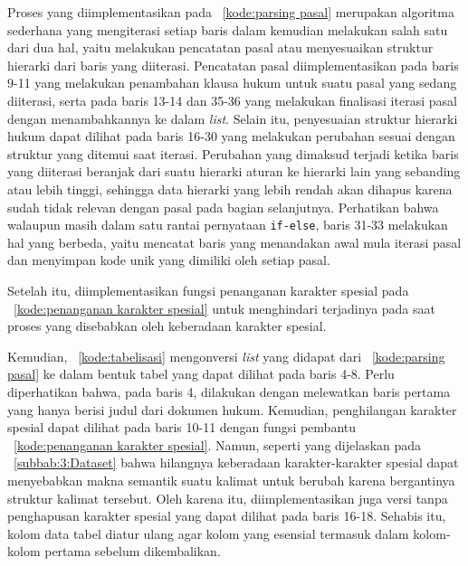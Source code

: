 Proses \parsing{} yang diimplementasikan pada \kode{}~\ref{kode:parsing pasal} merupakan algoritma sederhana yang mengiterasi setiap baris dalam \file{} kemudian melakukan salah satu dari dua hal, yaitu melakukan pencatatan pasal atau menyesuaikan struktur hierarki dari baris yang diiterasi. Pencatatan pasal diimplementasikan pada baris 9-11 yang melakukan penambahan klausa hukum untuk suatu pasal yang sedang diiterasi, serta pada baris 13-14 dan 35-36 yang melakukan finalisasi iterasi pasal dengan menambahkannya ke dalam \textit{list}. Selain itu, penyesuaian struktur hierarki hukum dapat dilihat pada baris 16-30 yang melakukan perubahan sesuai dengan struktur yang ditemui saat iterasi. Perubahan yang dimaksud terjadi ketika baris yang diiterasi beranjak dari suatu hierarki aturan ke hierarki lain yang sebanding atau lebih tinggi, sehingga data hierarki yang lebih rendah akan dihapus karena sudah tidak relevan dengan pasal pada bagian selanjutnya. Perhatikan bahwa walaupun masih dalam satu rantai pernyataan \lstinline{if-else}, baris 31-33 melakukan hal yang berbeda, yaitu mencatat baris yang menandakan awal mula iterasi pasal dan menyimpan kode unik yang dimiliki oleh setiap pasal.


Setelah itu, diimplementasikan fungsi penanganan karakter spesial pada \kode{}~\ref{kode:penanganan karakter spesial} untuk menghindari terjadinya \error{} pada saat proses \retrieval{} yang disebabkan oleh keberadaan karakter spesial.


Kemudian, \kode{}~\ref{kode:tabelisasi} mengonversi \textit{list} yang didapat dari \kode{}~\ref{kode:parsing pasal} ke dalam bentuk tabel yang dapat dilihat pada baris 4-8. Perlu diperhatikan bahwa, pada baris 4, \parsing{} dilakukan dengan melewatkan baris pertama yang hanya berisi judul dari dokumen hukum. Kemudian, penghilangan karakter spesial dapat dilihat pada baris 10-11 dengan fungsi pembantu \kode{}~\ref{kode:penanganan karakter spesial}. Namun, seperti yang dijelaskan pada \subbab{}~\ref{subbab:3:Dataset} bahwa hilangnya keberadaan karakter-karakter spesial dapat menyebabkan makna semantik suatu kalimat untuk berubah karena bergantinya struktur kalimat tersebut. Oleh karena itu, diimplementasikan juga versi tanpa penghapusan karakter spesial yang dapat dilihat pada baris 16-18. Sehabis itu, kolom data tabel diatur ulang agar kolom yang esensial termasuk dalam kolom-kolom pertama sebelum dikembalikan.


